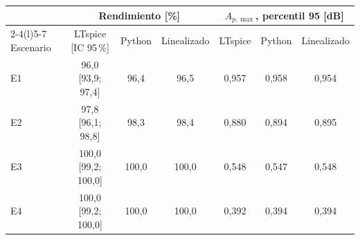 \begin{tabular}{@{}lcccccc@{}}
\toprule
& \multicolumn{3}{c}{Rendimiento [\%]} & \multicolumn{3}{c}{$A_{p,\max}$, percentil 95 [dB]} \\ \cmidrule(lr){2-4}\cmidrule(l){5-7} Escenario & LTspice [IC 95\,\%] & Python & Linealizado & LTspice & Python & Linealizado \\
\midrule
E1 & 96{,}0 [93{,}9; 97{,}4] & 96{,}4 & 96{,}5 & 0{,}957 & 0{,}958 & 0{,}954 \\
E2 & 97{,}8 [96{,}1; 98{,}8] & 98{,}3 & 98{,}4 & 0{,}880 & 0{,}894 & 0{,}895 \\
E3 & 100{,}0 [99{,}2; 100{,}0] & 100{,}0 & 100{,}0 & 0{,}548 & 0{,}547 & 0{,}548 \\
E4 & 100{,}0 [99{,}2; 100{,}0] & 100{,}0 & 100{,}0 & 0{,}392 & 0{,}394 & 0{,}394 \\
\bottomrule
\end{tabular}
